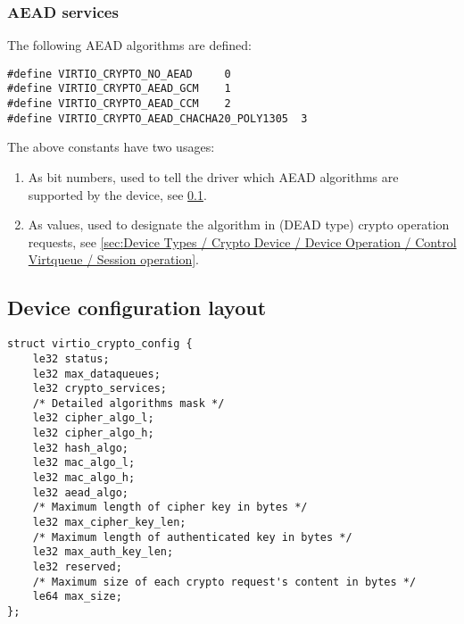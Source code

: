 \subsubsection{AEAD services}\label{sec:Device Types / Crypto Device / Supported crypto services / AEAD services}

The following AEAD algorithms are defined:

\begin{lstlisting}
#define VIRTIO_CRYPTO_NO_AEAD     0
#define VIRTIO_CRYPTO_AEAD_GCM    1
#define VIRTIO_CRYPTO_AEAD_CCM    2
#define VIRTIO_CRYPTO_AEAD_CHACHA20_POLY1305  3
\end{lstlisting}

The above constants have two usages:
\begin{enumerate}
\item As bit numbers, used to tell the driver which AEAD algorithms
are supported by the device, see \ref{sec:Device Types / Crypto Device / Device configuration layout}.
\item As values, used to designate the algorithm in (DEAD type) crypto
operation requests, see \ref{sec:Device Types / Crypto Device / Device Operation / Control Virtqueue / Session operation}.
\end{enumerate}

\subsection{Device configuration layout}\label{sec:Device Types / Crypto Device / Device configuration layout}

\begin{lstlisting}
struct virtio_crypto_config {
    le32 status;
    le32 max_dataqueues;
    le32 crypto_services;
    /* Detailed algorithms mask */
    le32 cipher_algo_l;
    le32 cipher_algo_h;
    le32 hash_algo;
    le32 mac_algo_l;
    le32 mac_algo_h;
    le32 aead_algo;
    /* Maximum length of cipher key in bytes */
    le32 max_cipher_key_len;
    /* Maximum length of authenticated key in bytes */
    le32 max_auth_key_len;
    le32 reserved;
    /* Maximum size of each crypto request's content in bytes */
    le64 max_size;
};
\end{lstlisting}

